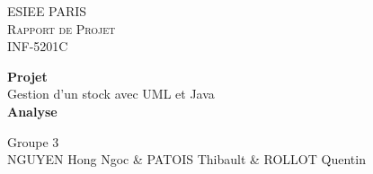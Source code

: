 \begin{titlepage}
\begin{center}

	\textsc{\LARGE ESIEE PARIS}\\
	\textsc{Rapport de Projet}\\
	\textsc{INF-5201C}\\[7cm]

	\begin{minipage}{0.8\textwidth}
		\begin{center}
		{ \huge \textbf{Projet} }\\[0.5cm]
		{ \huge Gestion d'un stock avec UML et Java}\\[0.5cm]
		{ \huge \textbf{Analyse} }
		\end{center}
	\end{minipage}

	\vfill

	{\large Groupe 3 } \\
	{\large NGUYEN Hong Ngoc \& PATOIS Thibault \& ROLLOT Quentin}
\end{center}
\end{titlepage}